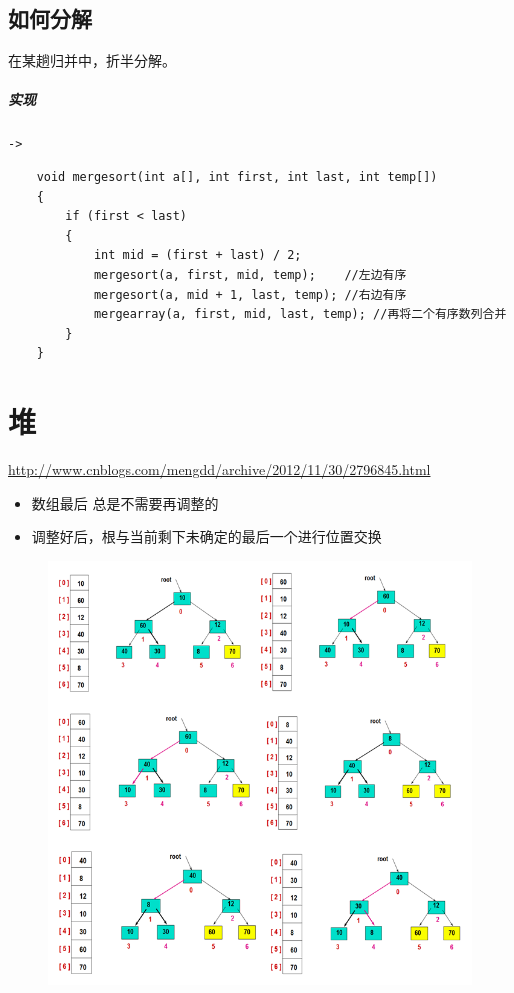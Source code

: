 \documentclass[UTF8,a4paper,12pt]{ctexbook}
\begin{document}
	\subsection{如何分解}
		在某趟归并中，折半分解。
	
		\subparagraph{实现}\verb|->|
		\begin{lstlisting}
	void mergesort(int a[], int first, int last, int temp[])  
	{  
		if (first < last)  
		{  
			int mid = (first + last) / 2;  
			mergesort(a, first, mid, temp);    //左边有序  
			mergesort(a, mid + 1, last, temp); //右边有序  
			mergearray(a, first, mid, last, temp); //再将二个有序数列合并  
		}  
	}  
		\end{lstlisting}
\section{堆}
	\url{http://www.cnblogs.com/mengdd/archive/2012/11/30/2796845.html}
	
		\begin{itemize}
			\item  数组最后 总是不需要再调整的
			\item  调整好后，根与当前剩下未确定的最后一个进行位置交换
		\end{itemize}
	
		\begin{figure}[h]
			\centering
			\includegraphics*[scale = 0.7]{Heap.png}
		\end{figure}
\end{document}
